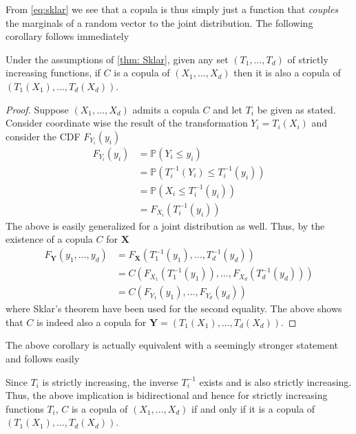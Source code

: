 \documentclass[../Thesis.tex]{subfiles}
\begin{document}
From \autoref{eq:sklar} we see that a copula is thus simply just a function that \textit{couples} the marginals of a random vector to the joint distribution. The following corollary follows immediately
\begin{corollary} \label{coro: Coordinate transformation}
    Under the assumptions of \autoref{thm: Sklar}, given any set $(T_1, \dots, T_d)$ of strictly increasing functions, if $C$ is a copula of $(X_1,\dots, X_d)$ then it is also a copula of $(T_1(X_1), \dots, T_d(X_d))$.
\end{corollary}
\begin{proof}
    Suppose $(X_1 , \dots , X_d)$ admits a copula $C$ and let $T_i$ be given as stated. Consider coordinate wise the result of the transformation $Y_i = T_i(X_i)$ and consider the CDF $F_{Y_i}(y_i)$
    \begin{align*}
        F_{Y_i}(y_i) & = \mathbb{P}\left(Y_i \leq y_i\right)                      \\
                     & = \mathbb{P}\left(T_i^{-1}(Y_i) \leq T_i^{-1}(y_i)\right)  \\
                     & = \mathbb{P}\left(X_i \leq T_i^{-1}\left(y_i\right)\right) \\
                     & = F_{X_i}\left(T_i^{-1}\left(y_i\right)\right)
    \end{align*}
    The above is easily generalized for a joint distribution as well. Thus, by the existence of a copula $C$ for $\boldsymbol{X}$
    \begin{align*}
        F_{\boldsymbol Y}(y_1, \dots, y_d) & = F_{\boldsymbol X} \left(T_1^{-1}\left(y_1\right),\dots , T_d^{-1}\left(y_d\right)\right)   \\
                                           & = C\left( F_{X_1}(T_1^{-1}\left(y_1\right)), \dots, F_{X_d}(T_d^{-1}\left(y_d\right))\right) \\
                                           & = C\left( F_{Y_1}(y_1), \dots, F_{Y_d}(y_d)\right)
    \end{align*}
    where Sklar's theorem have been used for the second equality. The above shows that $C$ is indeed also a copula for $\boldsymbol Y = \left(T_1(X_1), \dots, T_d(X_d)\right)$.
\end{proof}
The above corollary is actually equivalent with a seemingly stronger statement and follows easily
\begin{proposition}
    Since $T_i$ is strictly increasing, the inverse $T_i^{-1}$ exists and is also strictly increasing. Thus, the above implication is bidirectional and hence for strictly increasing functions $T_i$, $C$ is a copula of $\left(X_1,\dots,X_d\right)$ if and only if it is a copula of $\left(T_1(X_1),\dots, T_d(X_d)\right)$.
\end{proposition}
\end{document}
